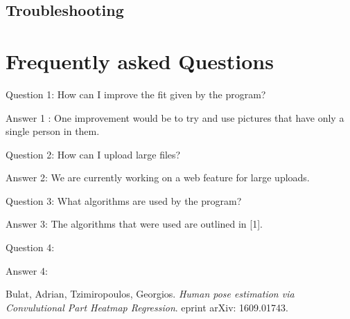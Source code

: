 \documentclass{scrreprt}
\begin{document}
\subsection{Troubleshooting}

\section{Frequently asked Questions}

Question 1: How can I improve the fit given by the program?

Answer 1 : One improvement would be to try and use pictures that have only a single person in them.

Question 2: How can I upload large files?

Answer 2: We are currently working on a web feature for large uploads.

Question 3: What algorithms are used by the program?

Answer 3: The algorithms that were used are outlined in [1].

Question 4:

Answer 4:

\begin{thebibliography}{9}

Bulat, Adrian, Tzimiropoulos, Georgios.
\textit{Human pose estimation via Convulutional Part Heatmap Regression}.
eprint arXiv: 1609.01743.

\end{thebibliography}
\end{document}
